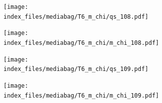 \documentclass[
  11pt,
  letterpaper,
]{scrreprt}
\begin{document}
\begin{figure}

\begin{minipage}{0.50\linewidth}

\begin{figure}[H]

{\centering \texttt{[image: index\_files/mediabag/T6\_m\_chi/qs\_108.pdf]}

}


\end{figure}%

\end{minipage}%
%
\begin{minipage}{0.50\linewidth}

\begin{figure}[H]

{\centering \texttt{[image: index\_files/mediabag/T6\_m\_chi/m\_chi\_108.pdf]}

}


\end{figure}%

\end{minipage}%

\end{figure}%

\begin{figure}

\begin{minipage}{0.50\linewidth}

\begin{figure}[H]

{\centering \texttt{[image: index\_files/mediabag/T6\_m\_chi/qs\_109.pdf]}

}


\end{figure}%

\end{minipage}%
%
\begin{minipage}{0.50\linewidth}

\begin{figure}[H]

{\centering \texttt{[image: index\_files/mediabag/T6\_m\_chi/m\_chi\_109.pdf]}

}


\end{figure}%

\end{minipage}%

\end{figure}%
\end{document}

